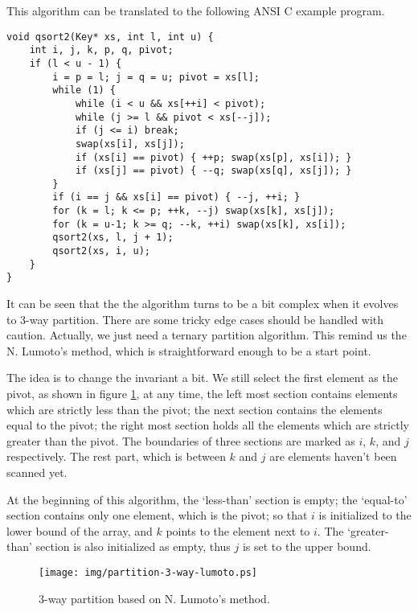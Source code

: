 \documentclass[UTF8]{article}
\begin{document}
This algorithm can be translated to the following ANSI C example program.

\lstset{language=C}
\begin{lstlisting}
void qsort2(Key* xs, int l, int u) {
    int i, j, k, p, q, pivot;
    if (l < u - 1) {
        i = p = l; j = q = u; pivot = xs[l];
        while (1) {
            while (i < u && xs[++i] < pivot);
            while (j >= l && pivot < xs[--j]);
            if (j <= i) break;
            swap(xs[i], xs[j]);
            if (xs[i] == pivot) { ++p; swap(xs[p], xs[i]); }
            if (xs[j] == pivot) { --q; swap(xs[q], xs[j]); }
        }
        if (i == j && xs[i] == pivot) { --j, ++i; }
        for (k = l; k <= p; ++k, --j) swap(xs[k], xs[j]);
        for (k = u-1; k >= q; --k, ++i) swap(xs[k], xs[i]);
        qsort2(xs, l, j + 1);
        qsort2(xs, i, u);
    }
}
\end{lstlisting}

It can be seen that the the algorithm turns to be a bit complex when it evolves to 3-way partition.
There are some tricky edge cases should be handled with caution. Actually, we just need a ternary
partition algorithm. This remind us the N. Lumoto's method, which is straightforward enough
to be a start point.

The idea is to change the invariant a bit. We still select the first element as the pivot,
as shown in figure \ref{fig:partition-3-way-lumoto},
at any time, the left most section contains elements which are strictly less than the pivot;
the next section contains the elements equal to the pivot; the right most section holds all the
elements which are strictly greater than the pivot. The boundaries of three sections are marked
as $i$, $k$, and $j$ respectively.
The rest part, which is between $k$ and $j$ are elements haven't been scanned yet.

At the beginning of this algorithm, the `less-than' section is empty; the `equal-to' section
contains only one element, which is the pivot; so that $i$ is initialized to the lower bound
of the array, and $k$ points to the element next to $i$. The `greater-than' section is also
initialized as empty, thus $j$ is set to the upper bound.

\begin{figure}[htbp]
   \centering
   \texttt{[image: img/partition-3-way-lumoto.ps]}
   \caption{3-way partition based on N. Lumoto's method.}
   \label{fig:partition-3-way-lumoto}
\end{figure}
\end{document}
